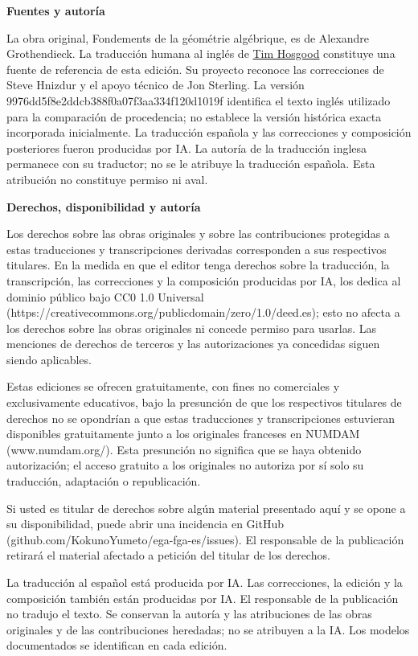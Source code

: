 \documentclass[11pt,twoside,openany]{book}
\theoremstyle{plain}
\theoremstyle{definition}
\theoremstyle{remark}
\begin{document}
\begingroup
\small
\noindent\textbf{Fuentes y autoría}

La obra original, Fondements de la géométrie algébrique, es de Alexandre Grothendieck. La traducción humana al inglés de \href{https://github.com/thosgood/fga/tree/9976dd5f8e2ddcb388f0a07f3aa334f120d1019f}{Tim Hosgood} constituye una fuente de referencia de esta edición. Su proyecto reconoce las correcciones de Steve Hnizdur y el apoyo técnico de Jon Sterling. La versión 9976dd5f8e2ddcb388f0a07f3aa334f120d1019f identifica el texto inglés utilizado para la comparación de procedencia; no establece la versión histórica exacta incorporada inicialmente. La traducción española y las correcciones y composición posteriores fueron producidas por IA. La autoría de la traducción inglesa permanece con su traductor; no se le atribuye la traducción española. Esta atribución no constituye permiso ni aval.

\noindent\textbf{Derechos, disponibilidad y autoría}

Los derechos sobre las obras originales y sobre las contribuciones protegidas a estas traducciones y transcripciones derivadas corresponden a sus respectivos titulares. En la medida en que el editor tenga derechos sobre la traducción, la transcripción, las correcciones y la composición producidas por IA, los dedica al dominio público bajo CC0 1.0 Universal (https://creativecommons.org/publicdomain/zero/1.0/deed.es); esto no afecta a los derechos sobre las obras originales ni concede permiso para usarlas. Las menciones de derechos de terceros y las autorizaciones ya concedidas siguen siendo aplicables.

Estas ediciones se ofrecen gratuitamente, con fines no comerciales y exclusivamente educativos, bajo la presunción de que los respectivos titulares de derechos no se opondrían a que estas traducciones y transcripciones estuvieran disponibles gratuitamente junto a los originales franceses en NUMDAM (www.numdam.org/). Esta presunción no significa que se haya obtenido autorización; el acceso gratuito a los originales no autoriza por sí solo su traducción, adaptación o republicación.

Si usted es titular de derechos sobre algún material presentado aquí y se opone a su disponibilidad, puede abrir una incidencia en GitHub (github.com/KokunoYumeto/ega-fga-es/issues). El responsable de la publicación retirará el material afectado a petición del titular de los derechos.

La traducción al español está producida por IA. Las correcciones, la edición y la composición también están producidas por IA. El responsable de la publicación no tradujo el texto. Se conservan la autoría y las atribuciones de las obras originales y de las contribuciones heredadas; no se atribuyen a la IA. Los modelos documentados se identifican en cada edición.
\par
\endgroup
\clearpage
\end{document}
